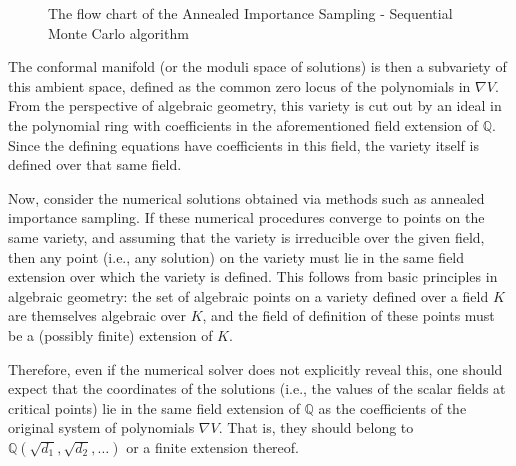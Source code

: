 \documentclass[11pt]{article}
\begin{document}
\begin{figure}[h!]
\begin{minipage}{14cm}
\begin{tcolorbox}
		\end{tcolorbox}
	\end{minipage}
	\caption{The flow chart of the Annealed Importance Sampling - Sequential Monte Carlo algorithm}
	\label{ASMCflowchart}
\end{figure}
  
  The conformal manifold (or the moduli space of solutions) is then a subvariety of this ambient space, defined as the common zero locus of the polynomials in $\nabla V$. From the perspective of algebraic geometry, this variety is cut out by an ideal in the polynomial ring with coefficients in the aforementioned field extension of $\mathbb{Q}$. Since the defining equations have coefficients in this field, the variety itself is defined over that same field.
  
  Now, consider the numerical solutions obtained via methods such as annealed importance sampling. If these numerical procedures converge to points on the same variety, and assuming that the variety is irreducible over the given field, then any point (i.e., any solution) on the variety must lie in the same field extension over which the variety is defined. This follows from basic principles in algebraic geometry: the set of algebraic points on a variety defined over a field $K$ are themselves algebraic over $K$, and the field of definition of these points must be a (possibly finite) extension of $K$.
  
  Therefore, even if the numerical solver does not explicitly reveal this, one should expect that the coordinates of the solutions (i.e., the values of the scalar fields at critical points) lie in the same field extension of $\mathbb{Q}$ as the coefficients of the original system of polynomials $\nabla V$. That is, they should belong to $\mathbb{Q}(\sqrt{d_1}, \sqrt{d_2}, \dots)$ or a finite extension thereof.
  
\end{document}
